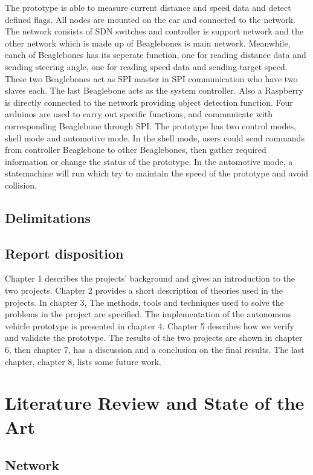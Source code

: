 \documentclass[11pt, titlepage]{article} %
\begin{document}
The prototype is able to measure current distance and speed data and detect defined flags. All nodes are mounted on the car and connected to the network. The network consists of SDN switches and controller is support network and the other network which is made up of Beaglebones is main network. Meanwhile, eanch of Beaglebones has its seperate function, one for reading distance data and sending steering angle, one for reading speed data and sending target speed. These two Beaglebones act as SPI master in SPI communication who have two slaves each. The last Beaglebone acts as the system controller. Also a Raspberry is directly connected to the network providing object detection function. Four arduinos are used to carry out specific functions, and communicate with corresponding Beaglebone through SPI.
The prototype has two control modes, shell mode and automotive mode. In the shell mode, users could send commands from controller Beaglebone to other Beaglebones, then gather required information or change the status of the prototype. In the automotive mode, a statemachine will run which try to maintain the speed of the prototype and avoid collision. 


\subsection{Delimitations}

\subsection{Report disposition}
Chapter 1 describes the projects' background and gives an introduction to the two projects. Chapter 2 provides a short description of theories used in the projects. In chapter 3, The methods, tools and techniques used to solve the problems in the project are specified. The implementation of the autonomous vehicle prototype is presented in chapter 4. Chapter 5 describes how we verify and validate the prototype. The results of the two projects are shown in chapter 6, then chapter 7, has a discussion and a conclusion on the final results. The last chapter, chapter 8, lists some future work.  
\clearpage
\section{Literature Review and State of the Art}

\subsection{Network}
\end{document}
